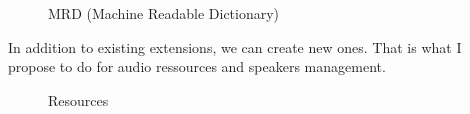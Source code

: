 \documentclass[a4paper,12pt]{article}
\begin{document}
\begin{figure}[h]
\centerline{}
\caption{MRD (Machine Readable Dictionary)}
\end{figure}

\pagebreak %

In addition to existing extensions, we can create new ones. That is what I propose to do for audio ressources and speakers management.

\begin{figure}[h]
\centerline{}
\caption{Resources}
\end{figure}
\end{document}
